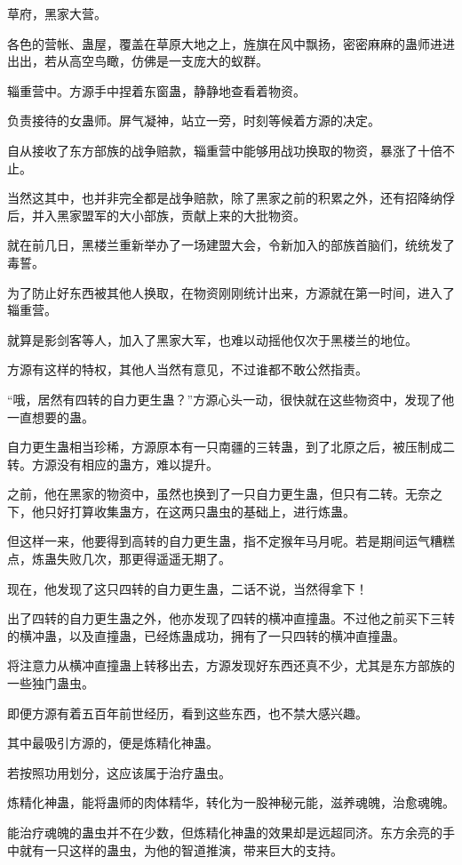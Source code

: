 \begin{this_body}
草府，黑家大营。

各色的营帐、蛊屋，覆盖在草原大地之上，旌旗在风中飘扬，密密麻麻的蛊师进进出出，若从高空鸟瞰，仿佛是一支庞大的蚁群。

辎重营中。方源手中捏着东窗蛊，静静地查看着物资。

负责接待的女蛊师。屏气凝神，站立一旁，时刻等候着方源的决定。

自从接收了东方部族的战争赔款，辎重营中能够用战功换取的物资，暴涨了十倍不止。

当然这其中，也并非完全都是战争赔款，除了黑家之前的积累之外，还有招降纳俘后，并入黑家盟军的大小部族，贡献上来的大批物资。

就在前几日，黑楼兰重新举办了一场建盟大会，令新加入的部族首脑们，统统发了毒誓。

为了防止好东西被其他人换取，在物资刚刚统计出来，方源就在第一时间，进入了辎重营。

就算是影剑客等人，加入了黑家大军，也难以动摇他仅次于黑楼兰的地位。

方源有这样的特权，其他人当然有意见，不过谁都不敢公然指责。

“哦，居然有四转的自力更生蛊？”方源心头一动，很快就在这些物资中，发现了他一直想要的蛊。

自力更生蛊相当珍稀，方源原本有一只南疆的三转蛊，到了北原之后，被压制成二转。方源没有相应的蛊方，难以提升。

之前，他在黑家的物资中，虽然也换到了一只自力更生蛊，但只有二转。无奈之下，他只好打算收集蛊方，在这两只蛊虫的基础上，进行炼蛊。

但这样一来，他要得到高转的自力更生蛊，指不定猴年马月呢。若是期间运气糟糕点，炼蛊失败几次，那更得遥遥无期了。

现在，他发现了这只四转的自力更生蛊，二话不说，当然得拿下！

出了四转的自力更生蛊之外，他亦发现了四转的横冲直撞蛊。不过他之前买下三转的横冲蛊，以及直撞蛊，已经炼蛊成功，拥有了一只四转的横冲直撞蛊。

将注意力从横冲直撞蛊上转移出去，方源发现好东西还真不少，尤其是东方部族的一些独门蛊虫。

即便方源有着五百年前世经历，看到这些东西，也不禁大感兴趣。

其中最吸引方源的，便是炼精化神蛊。

若按照功用划分，这应该属于治疗蛊虫。

炼精化神蛊，能将蛊师的肉体精华，转化为一股神秘元能，滋养魂魄，治愈魂魄。

能治疗魂魄的蛊虫并不在少数，但炼精化神蛊的效果却是远超同济。东方余亮的手中就有一只这样的蛊虫，为他的智道推演，带来巨大的支持。


\end{this_body}
